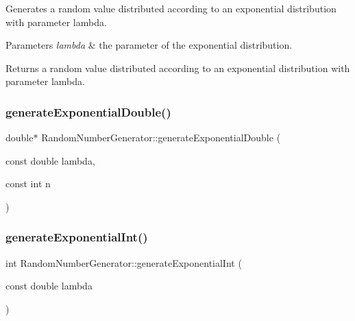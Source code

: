 Generates a random value distributed according to an exponential distribution with parameter lambda. 
\begin{DoxyParams}{Parameters}
{\em lambda} & the parameter of the exponential distribution. \\
\hline
\end{DoxyParams}
\begin{DoxyReturn}{Returns}
a random value distributed according to an exponential distribution with parameter lambda. 
\end{DoxyReturn}
\mbox{\label{class_random_number_generator_ad2cb2a790be0478f58fc9eb5f01adbb7}} 
\subsubsection{\texorpdfstring{generate\+Exponential\+Double()}{generateExponentialDouble()}\hspace{0.1cm}{\footnotesize\ttfamily [2/2]}}
{\footnotesize\ttfamily double$\ast$ Random\+Number\+Generator\+::generate\+Exponential\+Double (\begin{DoxyParamCaption}\item[{const double}]{lambda,  }\item[{const int}]{n }\end{DoxyParamCaption})}

\mbox{\label{class_random_number_generator_ab3b999e087c241671643b6c613bc0fd9}} 
\subsubsection{\texorpdfstring{generate\+Exponential\+Int()}{generateExponentialInt()}\hspace{0.1cm}{\footnotesize\ttfamily [1/2]}}
{\footnotesize\ttfamily int Random\+Number\+Generator\+::generate\+Exponential\+Int (\begin{DoxyParamCaption}\item[{const double}]{lambda }\end{DoxyParamCaption})}

